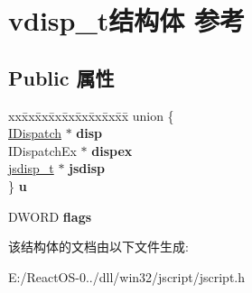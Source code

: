 \hypertarget{structvdisp__t}{}\section{vdisp\+\_\+t结构体 参考}
\label{structvdisp__t}
\subsection*{Public 属性}
\begin{DoxyCompactItemize}
\item 
\mbox{\label{structvdisp__t_a8d72d0044d62bd077ae354835c51a3bf}} 
\begin{tabbing}
xx\=xx\=xx\=xx\=xx\=xx\=xx\=xx\=xx\=\kill
union \{\\
\>\hyperlink{interface_i_dispatch}{IDispatch} $\ast$ {\bfseries disp}\\
\>IDispatchEx $\ast$ {\bfseries dispex}\\
\>\hyperlink{structjsdisp__t}{jsdisp\_t} $\ast$ {\bfseries jsdisp}\\
\} {\bfseries u}\\

\end{tabbing}\item 
\mbox{\label{structvdisp__t_a0631ef898f711c1d0fdd027ecd68d241}} 
D\+W\+O\+RD {\bfseries flags}
\end{DoxyCompactItemize}


该结构体的文档由以下文件生成\+:\begin{DoxyCompactItemize}
\item 
E\+:/\+React\+O\+S-\/0../dll/win32/jscript/jscript.\+h\end{DoxyCompactItemize}
